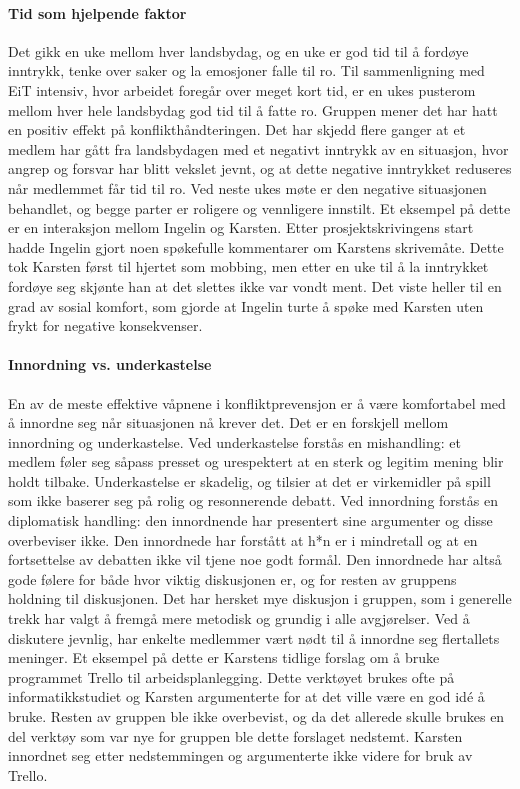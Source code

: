 \paragraph{Tid som hjelpende faktor}
Det gikk en uke mellom hver landsbydag, og en uke er god tid til å fordøye inntrykk, tenke over saker og la emosjoner falle til ro. 
Til sammenligning med EiT intensiv, hvor arbeidet foregår over meget kort tid, er en ukes pusterom mellom hver hele landsbydag god tid til å fatte ro.
Gruppen mener det har hatt en positiv effekt på konflikthåndteringen. 
Det har skjedd flere ganger at et medlem har gått fra landsbydagen med et negativt inntrykk av en situasjon, hvor angrep og forsvar har blitt vekslet jevnt, og at dette negative inntrykket reduseres når medlemmet får tid til ro.
Ved neste ukes møte er den negative situasjonen behandlet, og begge parter er roligere og vennligere innstilt.
Et eksempel på dette er en interaksjon mellom Ingelin og Karsten.
Etter prosjektskrivingens start hadde Ingelin gjort noen spøkefulle kommentarer om Karstens skrivemåte.
Dette tok Karsten først til hjertet som mobbing, men etter en uke til å la inntrykket fordøye seg skjønte han at det slettes ikke var vondt ment.
Det viste heller til en grad av sosial komfort, som gjorde at Ingelin turte å spøke med Karsten uten frykt for negative konsekvenser. 
\\
\paragraph{Innordning vs. underkastelse}
En av de meste effektive våpnene i konfliktprevensjon er å være komfortabel med å innordne seg når situasjonen nå krever det. 
Det er en forskjell mellom innordning og underkastelse. 
Ved underkastelse forstås en mishandling: et medlem føler seg såpass presset og urespektert at en sterk og legitim mening blir holdt tilbake. 
Underkastelse er skadelig, og tilsier at det er virkemidler på spill som ikke baserer seg på rolig og resonnerende debatt.
Ved innordning forstås en diplomatisk handling: den innordnende har presentert sine argumenter og disse overbeviser ikke.
Den innordnede har forstått at h*n er i mindretall og at en fortsettelse av debatten ikke vil tjene noe godt formål.
Den innordnede har altså gode følere for både hvor viktig diskusjonen er, og for resten av gruppens holdning til diskusjonen.
Det har hersket mye diskusjon i gruppen, som i generelle trekk har valgt å fremgå mere metodisk og grundig i alle avgjørelser.
Ved å diskutere jevnlig, har enkelte medlemmer vært nødt til å innordne seg flertallets meninger. 
Et eksempel på dette er Karstens tidlige forslag om å bruke programmet Trello til arbeidsplanlegging. 
Dette verktøyet brukes ofte på informatikkstudiet og Karsten argumenterte for at det ville være en god id\'{e} å bruke. 
Resten av gruppen ble ikke overbevist, og da det allerede skulle brukes en del verktøy som var nye for gruppen ble dette forslaget nedstemt. 
Karsten innordnet seg etter nedstemmingen og argumenterte ikke videre for bruk av Trello. 
\\
